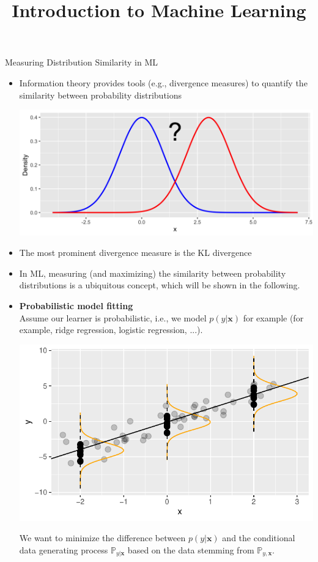 \documentclass[11pt,compress,t,notes=noshow, xcolor=table]{beamer}
\title{Introduction to Machine Learning}
\date{}
\begin{document}

\begin{vbframe} {Measuring Distribution Similarity in ML}
\begin{itemize}
    \item Information theory provides tools (e.g., divergence measures) to quantify the similarity between probability distributions
    
    \begin{center}
    \includegraphics[width=0.7\linewidth]{figure/normal_distributions.png}
    \end{center}
    
    \item The most prominent divergence measure is the KL divergence 
\item In ML, measuring (and maximizing) the similarity between probability distributions is a ubiquitous concept, which will be shown in the following.
\end{itemize}
\framebreak
\begin{itemize}
    \item \textbf{Probabilistic model fitting}\\
Assume our learner is probabilistic, i.e., we model $p(y| \mathbf{x})$ for example (for example, ridge regression, logistic regression, ...).

\begin{center}
\includegraphics[width=0.5\linewidth]{figure/ftrue.pdf}
\end{center}

We want to minimize the difference between $p(y \vert \mathbf{x})$ and the conditional data generating process $\mathbb{P}_{y\vert\mathbf{x}}$ based on the data stemming from $\mathbb{P}_{y, \mathbf{x}}.$


\end{itemize}
\end{vbframe}
\end{document}
